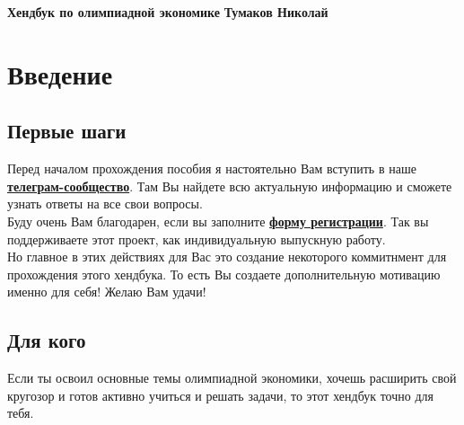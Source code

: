 






\thispagestyle{plain}
\begin{titlepage}
    \hfill\begin{center}
        \begin{tcolorbox}[
            collower=\mycolor{\mycolorlower},
            colupper=\mycolor{\mycolorupper},
            colframe=\mycolor{\mycolorframe},
            colback=\mycolor{\mycolorback},
            fonttitle=\Large\bfseries\centering,
            title=Модель Хотеллинга. Сигналинг. Вертикальная дифференциация товара
        ]
        \large\centering\textbf{Хендбук по олимпиадной экономике}
        \tcblower
        \centering\textbf{Тумаков Николай}
        \end{tcolorbox}
    \end{center}
\end{titlepage}

\restoregeometry

\tableofcontents



\chapter{Введение}


\section{Первые шаги}
\indent\setlength{\parindent}{1em}Перед началом прохождения пособия я настоятельно Вам вступить в наше
\textbf{\href{https://t.me/econ_handbook_screening}{телеграм-сообщество}}. Там Вы найдете всю актуальную информацию и
сможете узнать ответы на все свои вопросы.\smallskip\\
\indent\setlength{\parindent}{1em}Буду очень Вам благодарен, если вы заполните \textbf{\href{https://forms.gle/bW7CD2zcdUhnbFnR7}{форму регистрации}}. Так вы поддерживаете
этот проект, как индивидуальную выпускную работу.\smallskip\\
\indent\setlength{\parindent}{1em}Но главное в этих действиях для Вас это создание некоторого коммитнмент для прохождения этого хендбука. То есть Вы создаете дополнительную мотивацию именно для себя! Желаю Вам удачи!

\section{Для кого}
\indent\setlength{\parindent}{1em}Если ты освоил основные темы олимпиадной экономики, хочешь расширить свой кругозор и готов активно учиться и решать задачи, то этот хендбук точно для тебя.

